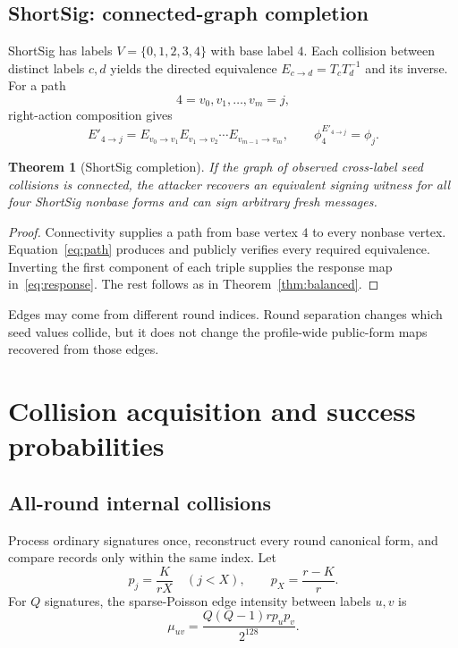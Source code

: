 \documentclass[11pt,a4paper]{article}
\newtheorem{theorem}{Theorem}
\begin{document}
\subsection{ShortSig: connected-graph completion}

ShortSig has labels $V=\{0,1,2,3,4\}$ with base label $4$.  Each collision
between distinct labels $c,d$ yields the directed equivalence
$E_{c\rightarrow d}=T_cT_d^{-1}$ and its inverse.  For a path
\[
 4=v_0,v_1,\ldots,v_m=j,
\]
right-action composition gives
\begin{equation}
 E'_{4\rightarrow j}=E_{v_0\rightarrow v_1}
                      E_{v_1\rightarrow v_2}\cdots
                      E_{v_{m-1}\rightarrow v_m},
 \qquad \phi_4^{E'_{4\rightarrow j}}=\phi_j.           \label{eq:path}
\end{equation}

\begin{theorem}[ShortSig completion]\label{thm:shortsig}
If the graph of observed cross-label seed collisions is connected, the
attacker recovers an equivalent signing witness for all four ShortSig nonbase
forms and can sign arbitrary fresh messages.
\end{theorem}
\begin{proof}
Connectivity supplies a path from base vertex $4$ to every nonbase vertex.
Equation~\eqref{eq:path} produces and publicly verifies every required
equivalence.  Inverting the first component of each triple supplies the
response map in~\eqref{eq:response}.  The rest follows as in
Theorem~\ref{thm:balanced}.
\end{proof}

Edges may come from different round indices.  Round separation changes which
seed values collide, but it does not change the profile-wide public-form maps
recovered from those edges.

\section{Collision acquisition and success probabilities}

\subsection{All-round internal collisions}

Process ordinary signatures once, reconstruct every round canonical form, and
compare records only within the same index.  Let
\begin{equation}
 p_j=\frac{K}{rX}\quad(j<X),\qquad p_X=\frac{r-K}{r}.   \label{eq:labelprob}
\end{equation}
For $Q$ signatures, the sparse-Poisson edge intensity between labels $u,v$ is
\begin{equation}
             \mu_{uv}=\frac{Q(Q-1)r p_up_v}{2^{128}}.   \label{eq:edgepoisson}
\end{equation}
\end{document}
